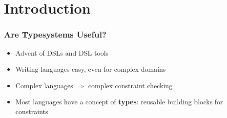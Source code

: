 \def \typIntro {Typesystem Introduction}
\section{Introduction}

\begin{frame}
  \frametitle{Are Typesystems Useful?}
  
  \begin{itemize}
    \item Advent of DSLs and DSL tools
    \item Writing languages easy, even for complex domains
    \item Complex languages $\Rightarrow$ complex constraint checking
    \item Most languages have a concept of \textbf{types}: reusable building
    blocks for constraints
  \end{itemize}
\end{frame}

\begin{frame}
   \tableofcontents
{}
\end{frame}

